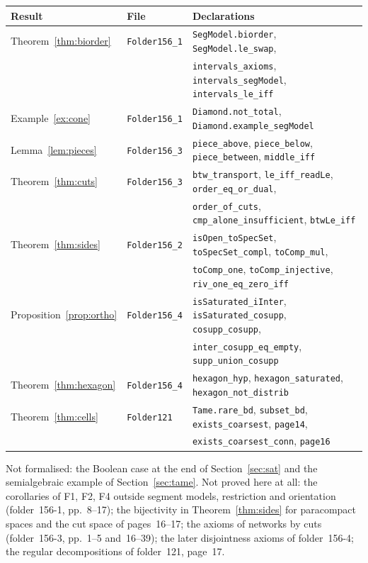 \documentclass[11pt,a4paper]{amsart}
\theoremstyle{definition}
\theoremstyle{remark}
\begin{document}
\begin{center}
\small
\begin{tabular}{@{}lll@{}}
Result & File & Declarations \\
\hline
Theorem~\ref{thm:biorder} & \texttt{Folder156\_1} & \texttt{SegModel.biorder}, \texttt{SegModel.le\_swap}, \\
 & & \texttt{intervals\_axioms}, \texttt{intervals\_segModel}, \texttt{intervals\_le\_iff} \\
Example~\ref{ex:cone} & \texttt{Folder156\_1} & \texttt{Diamond.not\_total}, \texttt{Diamond.example\_segModel} \\
Lemma~\ref{lem:pieces} & \texttt{Folder156\_3} & \texttt{piece\_above}, \texttt{piece\_below}, \texttt{piece\_between}, \texttt{middle\_iff} \\
Theorem~\ref{thm:cuts} & \texttt{Folder156\_3} & \texttt{btw\_transport}, \texttt{le\_iff\_readLe}, \texttt{order\_eq\_or\_dual}, \\
 & & \texttt{order\_of\_cuts}, \texttt{cmp\_alone\_insufficient}, \texttt{btwLe\_iff} \\
Theorem~\ref{thm:sides} & \texttt{Folder156\_2} & \texttt{isOpen\_toSpecSet}, \texttt{toSpecSet\_compl}, \texttt{toComp\_mul}, \\
 & & \texttt{toComp\_one}, \texttt{toComp\_injective}, \texttt{riv\_one\_eq\_zero\_iff} \\
Proposition~\ref{prop:ortho} & \texttt{Folder156\_4} & \texttt{isSaturated\_iInter}, \texttt{isSaturated\_cosupp}, \texttt{cosupp\_cosupp}, \\
 & & \texttt{inter\_cosupp\_eq\_empty}, \texttt{supp\_union\_cosupp} \\
Theorem~\ref{thm:hexagon} & \texttt{Folder156\_4} & \texttt{hexagon\_hyp}, \texttt{hexagon\_saturated}, \texttt{hexagon\_not\_distrib} \\
Theorem~\ref{thm:cells} & \texttt{Folder121} & \texttt{Tame.rare\_bd}, \texttt{subset\_bd}, \texttt{exists\_coarsest}, \texttt{page14}, \\
 & & \texttt{exists\_coarsest\_conn}, \texttt{page16} \\
\end{tabular}
\end{center}
\medskip

Not formalised: the Boolean case at the end of Section~\ref{sec:sat} and the semialgebraic example of Section~\ref{sec:tame}. Not proved here at all: the corollaries of F1, F2, F4 outside segment models, restriction and orientation (folder~156-1, pp.~8--17); the bijectivity in Theorem~\ref{thm:sides} for paracompact spaces and the cut space of pages~16--17; the axioms of networks by cuts (folder~156-3, pp.~1--5 and~16--39); the later disjointness axioms of folder~156-4; the regular decompositions of folder~121, page~17.
\end{document}
